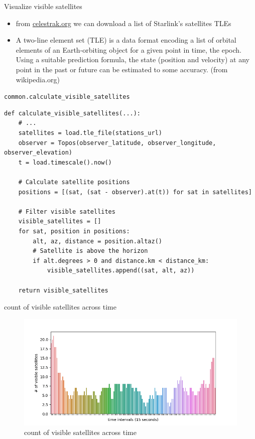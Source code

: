 \documentclass[NET,english,beameralt]{tumbeamer}
\begin{document}
\begin{frame}{Visualize visible satellites}
\begin{itemize}
    \item from \href{celestrak.org}{celestrak.org} we can download a list of Starlink's satellites TLEs
    \item A two-line element set (TLE) is a data format encoding a list of orbital elements of an Earth-orbiting object for a given point in time, the epoch. Using a suitable prediction formula, the state (position and velocity) at any point in the past or future can be estimated to some accuracy. (from wikipedia.org)
\end{itemize}
\end{frame}

\begin{frame}[fragile]{\texttt{common.calculate\_visible\_satellites}}
\begin{verbatim}
def calculate_visible_satellites(...):
    # ...
    satellites = load.tle_file(stations_url)
    observer = Topos(observer_latitude, observer_longitude, observer_elevation)
    t = load.timescale().now()

    # Calculate satellite positions
    positions = [(sat, (sat - observer).at(t)) for sat in satellites]
    
    # Filter visible satellites
    visible_satellites = []
    for sat, position in positions:
        alt, az, distance = position.altaz()
        # Satellite is above the horizon
        if alt.degrees > 0 and distance.km < distance_km:
            visible_satellites.append((sat, alt, az))

    return visible_satellites
\end{verbatim}
\end{frame}

\begin{frame}{count of visible satellites across time}
\begin{figure}
    \includegraphics[width=1\textwidth]{pics/count_visible_satellites.png}
    \caption[short]{count of visible satellites across time}
\end{figure}
\end{frame}
\end{document}
